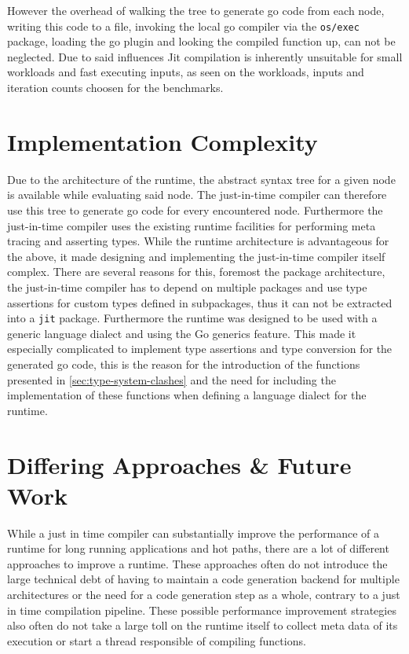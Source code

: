 However the overhead of walking the tree to generate go code from each node,
writing this code to a file, invoking the local go compiler via the
\texttt{os/exec} package, loading the go plugin and looking the compiled
function up, can not be neglected. Due to said influences Jit compilation
is inherently unsuitable for small workloads and fast executing inputs, as seen
on the workloads, inputs and iteration counts choosen for the benchmarks. 

\section{Implementation Complexity}

Due to the architecture of the runtime, the abstract syntax tree for a given
node is available while evaluating said node. The just-in-time compiler can
therefore use this tree to generate go code for every encountered node.
Furthermore the just-in-time compiler uses the existing runtime facilities for
performing meta tracing and asserting types. While the runtime architecture is
advantageous for the above, it made designing and implementing the just-in-time
compiler itself complex. There are several reasons for this, foremost the
package architecture, the just-in-time compiler has to depend on multiple
packages and use type assertions for custom types defined in subpackages, thus
it can not be extracted into a \texttt{jit} package. Furthermore the runtime
was designed to be used with a generic language dialect and using the Go
generics feature. This made it especially complicated to implement type
assertions and type conversion for the generated go code, this is the reason
for the introduction of the functions presented in
\autoref{sec:type-system-clashes} and the need for including the implementation
of these functions when defining a language dialect for the runtime.

\section{Differing Approaches \& Future Work}

While a just in time compiler can substantially improve the performance of a
runtime for long running applications and hot paths, there are a lot of
different approaches to improve a runtime. These approaches often do not
introduce the large technical debt of having to maintain a code generation
backend for multiple architectures or the need for a code generation step as a
whole, contrary to a just in time compilation pipeline. These possible
performance improvement strategies also often do not take a large toll on the
runtime itself to collect meta data of its execution or start a thread
responsible of compiling functions.

